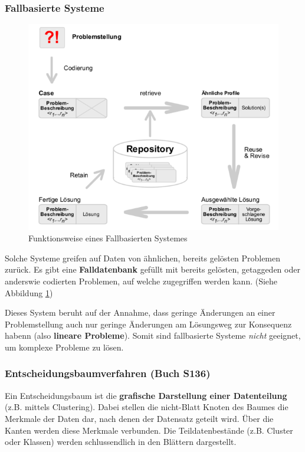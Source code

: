 \documentclass[a4paper, 11pt, nofootinbib]{article}
\begin{document}
 \vspace{90px}

\subsubsection{Fallbasierte Systeme}

\begin{figure}
	\centering
	\includegraphics[keepaspectratio=true,height=12\baselineskip]{fallbasiert.png}
	\caption{Funktionsweise eines Fallbasierten Systemes}
	\label{fig:fallbasiert}
\end{figure}

Solche Systeme greifen auf Daten von ähnlichen, bereits gelösten Problemen zurück. Es gibt eine \textbf{Falldatenbank} gefüllt mit bereits gelösten, getaggeden oder anderswie codierten Problemen, auf welche zugegriffen werden kann. (Siehe Abbildung \ref{fig:fallbasiert})

Dieses System beruht auf der Annahme, dass geringe Änderungen an einer Problemstellung auch nur geringe Änderungen am Lösungsweg zur Konsequenz habenn (also \textbf{lineare Probleme}). Somit sind fallbasierte Systeme \textit{nicht} geeignet, um komplexe Probleme zu lösen.

\newpage

\subsubsection{Entscheidungsbaumverfahren (Buch S136)}
Ein Entscheidungsbaum ist die \textbf{grafische Darstellung einer Datenteilung} (z.B. mittels Clustering). Dabei stellen die nicht-Blatt Knoten des Baumes die Merkmale der Daten dar, nach denen der Datensatz geteilt wird. Über die Kanten werden diese Merkmale verbunden. Die Teildatenbestände (z.B. Cluster oder Klassen) werden schlussendlich in den Blättern dargestellt.
\end{document}
